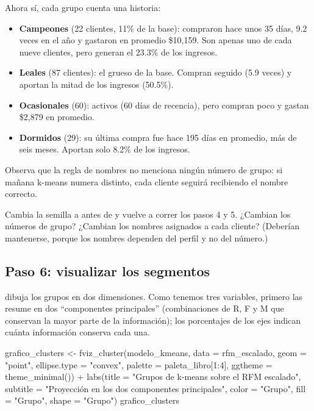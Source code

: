 Ahora sí, cada grupo cuenta una historia:

\begin{itemize}
  \item \textbf{Campeones} (22 clientes, 11\% de la base): compraron hace unos
        35 días, 9.2 veces en el año y gastaron en promedio \$10{,}159. Son
        apenas uno de cada nueve clientes, pero generan el 23.3\% de los
        ingresos.
  \item \textbf{Leales} (87 clientes): el grueso de la base. Compran seguido
        (5.9 veces) y aportan la mitad de los ingresos (50.5\%).
  \item \textbf{Ocasionales} (60): activos (60 días de recencia), pero compran
        poco y gastan \$2{,}879 en promedio.
  \item \textbf{Dormidos} (29): su última compra fue hace 195 días en
        promedio, más de seis meses. Aportan solo 8.2\% de los ingresos.
\end{itemize}

Observa que la regla de nombres no menciona ningún número de grupo: si mañana
k-means numera distinto, cada cliente seguirá recibiendo el nombre correcto.

\begin{hazlotu}
Cambia la semilla a  antes de  y vuelve
a correr los pasos 4 y 5. ¿Cambian los números de grupo? ¿Cambian los nombres
asignados a cada cliente? (Deberían mantenerse, porque los nombres dependen del
perfil y no del número.)
\end{hazlotu}

\subsection{Paso 6: visualizar los segmentos}

 dibuja los grupos en dos dimensiones. Como tenemos tres
variables, primero las resume en dos ``componentes principales'' (combinaciones
de R, F y M que conservan la mayor parte de la información); los porcentajes de
los ejes indican cuánta información conserva cada una.

\begin{rcode}
grafico_clusters <- fviz_cluster(modelo_kmeans, data = rfm_escalado,
                                 geom = "point", ellipse.type = "convex",
                                 palette = paleta_libro[1:4],
                                 ggtheme = theme_minimal()) +
  labs(title = "Grupos de k-means sobre el RFM escalado",
       subtitle = "Proyección en los dos componentes principales",
       color = "Grupo", fill = "Grupo", shape = "Grupo")
grafico_clusters
\end{rcode}

